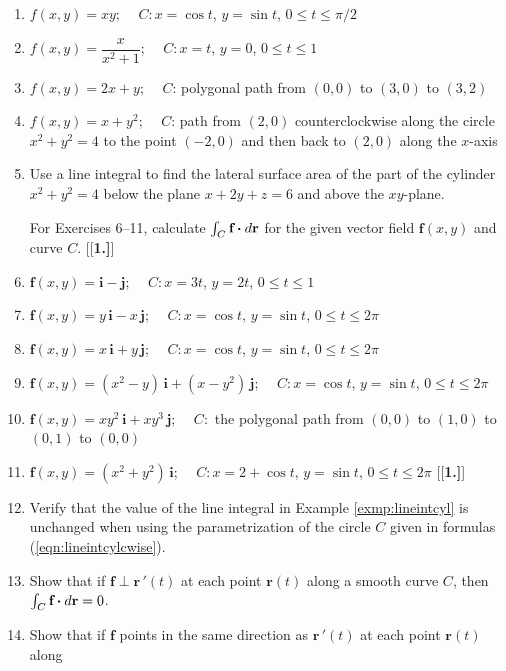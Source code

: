 \begin{enumerate}[\bfseries 1.]
 \item $f(x,y)=xy$; $\quad C: x=\cos t$, $y=\sin t$, $0 \le t \le \pi/2$
 \item $f(x,y)=\dfrac{x}{x^2 + 1}$; $\quad C: x=t$, $y=0$, $0 \le t \le 1$
 \item $f(x,y)=2x+y$; $\quad C$: polygonal path from $(0,0)$ to $(3,0)$ to $(3,2)$
 \item $f(x,y)=x+y^2$; $\quad C$: path from $(2,0)$ counterclockwise along the circle $x^2 + y^2 = 4$ to the point
  $(-2,0)$ and then back to $(2,0)$ along the $x$-axis
 \item Use a line integral to find the lateral surface area of the part of the cylinder\\$x^2 + y^2 = 4$ below
 the plane $x+2y+z=6$ and above the $xy$-plane.
\par\noindent For Exercises 6--11, calculate $\int_C \textbf{f} \bm{\cdot} d\textbf{r}$ for the given vector
 field $\textbf{f}(x,y)$ and curve $C$.
[{[\bfseries 1.]}]
 \item $\textbf{f}(x,y) = \textbf{i} - \textbf{j}$; $\quad C: x=3t$, $y=2t$, $0 \le t \le 1$
 \item $\textbf{f}(x,y) = y\,\textbf{i} - x\,\textbf{j}$; $\quad C: x=\cos t$, $y=\sin t$, $0 \le t \le 2\pi$
 \item $\textbf{f}(x,y) = x\,\textbf{i} + y\,\textbf{j}$; $\quad C: x=\cos t$, $ y=\sin t$, $0 \le t \le 2\pi$
 \item $\textbf{f}(x,y) = (x^2 - y)\,\textbf{i} + (x-y^2 )\,\textbf{j}$; $\quad C: x=\cos t$, $y=\sin t$,
  $0 \le t \le 2\pi$
 \item $\textbf{f}(x,y) = xy^2 \,\textbf{i} + xy^3 \,\textbf{j}$; $\quad C:$ the polygonal path from $(0,0)$ to $(1,0)$
 to $(0,1)$ to $(0,0)$
 \item $\textbf{f}(x,y) =(x^2 + y^2 )\,\textbf{i}$; $\quad C: x=2+\cos t$, $y=\sin t$, $0 \le t \le 2\pi$
[{[\bfseries 1.]}]
 \item Verify that the value of the line integral in Example \ref{exmp:lineintcyl} is unchanged when using the
  parametrization of the circle $C$ given in formulas (\ref{eqn:lineintcylcwise}).
 \item Show that if $\textbf{f} \perp \textbf{r}\,'(t)$ at each point $\textbf{r}(t)$ along a smooth curve $C$, then
  $\int_C \textbf{f} \bm{\cdot} d\textbf{r} = 0$.
 \item Show that if $\textbf{f}$ points in the same direction as $\textbf{r}\,'(t)$ at each point $\textbf{r}(t)$ along

\end{enumerate}
